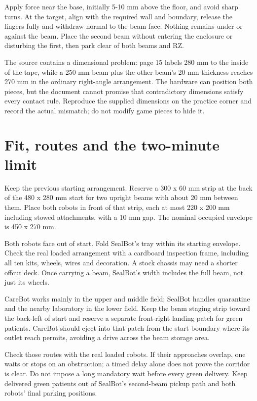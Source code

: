\documentclass[10pt,a4paper]{article}
\begin{document}
Apply force near the base, initially 5-10 mm above the floor, and avoid sharp turns. At the target, align with the required wall and boundary, release the fingers fully and withdraw normal to the beam face. Nothing remains under or against the beam. Place the second beam without entering the enclosure or disturbing the first, then park clear of both beams and RZ.

The source contains a dimensional problem: page 15 labels 280 mm to the inside of the tape, while a 250 mm beam plus the other beam's 20 mm thickness reaches 270 mm in the ordinary right-angle arrangement. The hardware can position both pieces, but the document cannot promise that contradictory dimensions satisfy every contact rule. Reproduce the supplied dimensions on the practice corner and record the actual mismatch; do not modify game pieces to hide it.

\section{Fit, routes and the two-minute limit}
Keep the previous starting arrangement. Reserve a 300 x 60 mm strip at the back of the 480 x 280 mm start for two upright beams with about 20 mm between them. Place both robots in front of that strip, each at most 220 x 200 mm including stowed attachments, with a 10 mm gap. The nominal occupied envelope is 450 x 270 mm.

Both robots face out of start. Fold SealBot's tray within its starting envelope. Check the real loaded arrangement with a cardboard inspection frame, including all ten kits, wheels, wires and decoration. A stock chassis may need a shorter offcut deck. Once carrying a beam, SealBot's width includes the full beam, not just its wheels.

CareBot works mainly in the upper and middle field; SealBot handles quarantine and the nearby laboratory in the lower field. Keep the beam staging strip toward the back-left of start and reserve a separate front-right landing patch for green patients. CareBot should eject into that patch from the start boundary where its outlet reach permits, avoiding a drive across the beam storage area.

Check those routes with the real loaded robots. If their approaches overlap, one waits or stops on an obstruction; a timed delay alone does not prove the corridor is clear. Do not impose a long mandatory wait before every green delivery. Keep delivered green patients out of SealBot's second-beam pickup path and both robots' final parking positions.
\end{document}

